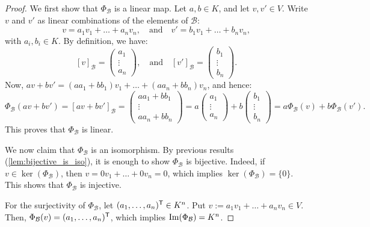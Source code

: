\begin{proof}
We first show that $\Phi_{\mathcal{B}}$ is a linear map. Let $a, b \in K$, and let $v, v' \in V$. Write $v$ and $v'$ as linear combinations of the elements of $\mathcal{B}$:
\[
v = a_1 v_1 + \dots + a_n v_n, \quad \text{and} \quad v' = b_1 v_1 + \dots + b_n v_n,
\]
with $a_i, b_i \in K$. By definition, we have:
\[
[v]_{\mathcal{B}} = 
\begin{pmatrix}
a_1 \\
\vdots \\
a_n
\end{pmatrix},
\quad \text{and} \quad
[v']_{\mathcal{B}} = 
\begin{pmatrix}
b_1 \\
\vdots \\
b_n
\end{pmatrix}.
\]
Now, $a v + b v' = (a a_1 + b b_1) v_1 + \dots + (a a_n + b b_n) v_n$, and hence:
\[
\Phi_{\mathcal{B}}(a v + b v') = [a v + b v']_{\mathcal{B}} = 
\begin{pmatrix}
a a_1 + b b_1 \\
\vdots \\
a a_n + b b_n
\end{pmatrix}
= a 
\begin{pmatrix}
a_1 \\
\vdots \\
a_n
\end{pmatrix}
+ b
\begin{pmatrix}
b_1 \\
\vdots \\
b_n
\end{pmatrix}
= a \Phi_{\mathcal{B}}(v) + b \Phi_{\mathcal{B}}(v').
\]
This proves that $\Phi_{\mathcal{B}}$ is linear. 

We now claim that $\Phi_{\mathcal{B}}$ is an isomorphism. By previous results (\cref{lem:bijective_is_iso}), it is enough to show $\Phi_{\mathcal{B}}$ is bijective. Indeed, if $v \in \ker(\Phi_{\mathcal{B}})$, then $v = 0 v_1 + \dots + 0 v_n = 0$, which implies $\ker(\Phi_{\mathcal{B}}) = \{0\}$. This shows that $\Phi_{\mathcal{B}}$ is injective. 

For the surjectivity of $\Phi_{\mathcal{B}}$, let $(a_1, \dots, a_n)^{\mathsf{T}} \in K^n$. Put $v := a_1 v_1 + \dots + a_n v_n \in V$. Then, $\Phi_{\mathcal{B}}(v) = (a_1, \dots, a_n)^{\mathsf{T}}$, which implies $\operatorname{Im}(\Phi_{\mathcal{B}}) = K^n$.
\end{proof}

